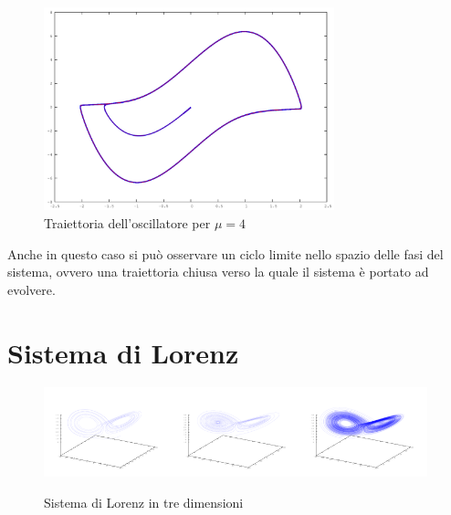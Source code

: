 \begin{figure}[H]
\centering
\includegraphics[width=0.75\textwidth]{vanderpol}
\caption{Traiettoria dell'oscillatore per $\mu = 4$}
\label{fig:vanderpol}
\end{figure}
Anche in questo caso si può osservare un ciclo limite nello spazio delle fasi del sistema, ovvero una traiettoria chiusa verso la quale il sistema è portato ad evolvere.

\section{Sistema di Lorenz}
\begin{figure}[H]
\centering
\includegraphics[width=0.33\textwidth]{lorenz0}\includegraphics[width=0.33\textwidth]{lorenz1}\includegraphics[width=0.33\textwidth]{lorenz2}
\caption{Sistema di Lorenz in tre dimensioni}
\label{fig:lorenz}
\end{figure}

